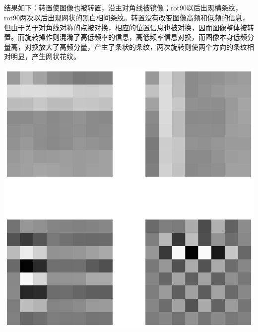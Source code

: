 \documentclass{article}
\begin{document}
\subsection{}
\noindent{}
\par 结果如下：转置使图像也被转置，沿主对角线被镜像；rot90以后出现横条纹，rot90两次以后出现网状的黑白相间条纹。转置没有改变图像高频和低频的信息，但由于关于对角线对称的点被对换，相应的位置信息也被对换，因而图像整体被转置。而旋转操作则混淆了高低频率的信息，高低频率信息对换，而图像本身低频分量高，对换放大了高频分量，产生了条状的条纹，两次旋转则使两个方向的条纹相对明显，产生网状花纹。
\par\begin{center}\includegraphics[width=\textwidth]{A3_2_4.eps}\end{center}
\end{document}
